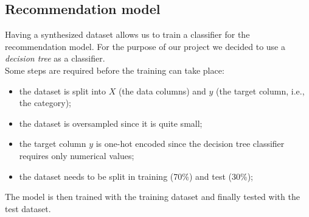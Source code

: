 \documentclass[../../main]{subfiles}
\begin{document}
\subsection{Recommendation model}
\label{ss:recommendation-model}

Having a synthesized dataset allows us to train a classifier for the recommendation model.
For the purpose of our project we decided to use a \textit{decision tree} as a classifier.\\
Some steps are required before the training can take place:
\begin{itemize}
    \item the dataset is split into $X$ (the data columns) and $y$ (the target column, i.e., the category);
    \item the dataset is oversampled since it is quite small;
    \item the target column $y$ is one-hot encoded since the decision tree classifier requires only numerical values;
    \item the dataset needs to be split in training (70\%) and test (30\%);
\end{itemize}
The model is then trained with the training dataset and finally tested with the test dataset.
\end{document}
